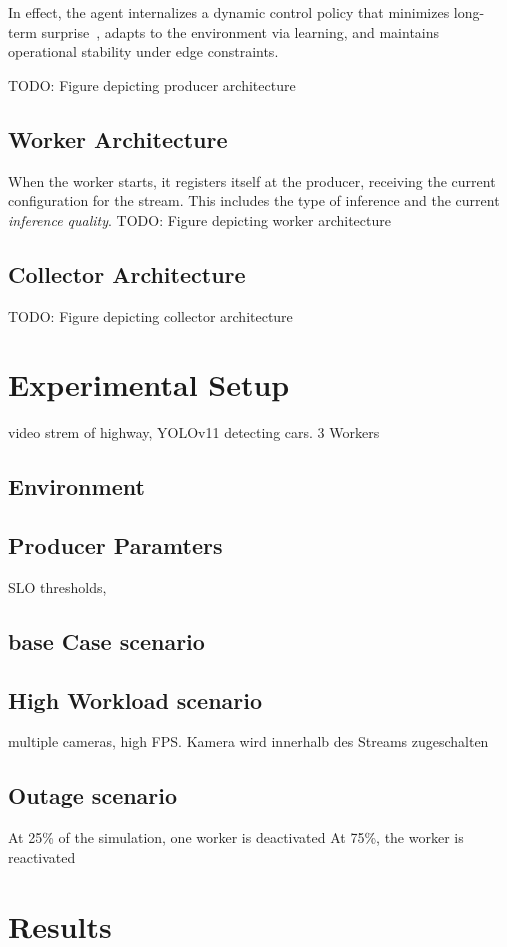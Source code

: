 In effect, the agent internalizes a dynamic control policy that minimizes long-term surprise~\cite{sedlak_adaptive_2024}, adapts to the environment via learning, and maintains operational stability under edge constraints.


TODO: Figure depicting producer architecture
\subsection{Worker Architecture}
When the worker starts, it registers itself at the producer, receiving the current configuration for the stream. This includes the type of inference and the current \textit{inference quality}.
TODO: Figure depicting worker architecture
\subsection{Collector Architecture}
TODO: Figure depicting collector architecture


\section{Experimental Setup}
video strem of highway, YOLOv11 detecting cars. 3 Workers

\subsection{Environment}
\subsection{Producer Paramters}
SLO thresholds, 
\subsection{base Case scenario}
\subsection{High Workload scenario}
multiple cameras, high FPS.
Kamera wird innerhalb des Streams zugeschalten
\subsection{Outage scenario}
At 25\% of the simulation, one worker is deactivated
At 75\%, the worker is reactivated

\section{Results}